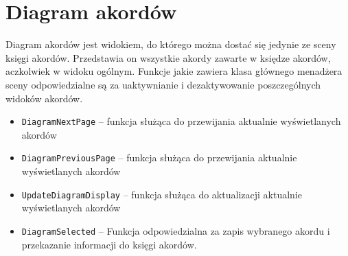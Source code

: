\section{Diagram akordów}

Diagram akordów jest widokiem, do którego można dostać się jedynie ze sceny księgi akordów. Przedstawia on wszystkie akordy zawarte w księdze akordów, aczkolwiek w widoku ogólnym. Funkcje jakie zawiera klasa głównego menadżera sceny odpowiedzialne są za uaktywnianie i dezaktywowanie poszczególnych widoków akordów.

\begin{itemize}
    \item \texttt{DiagramNextPage} -- funkcja służąca do przewijania aktualnie wyświetlanych akordów
    \item \texttt{DiagramPreviousPage} -- funkcja służąca do przewijania aktualnie wyświetlanych akordów
    \item \texttt{UpdateDiagramDisplay} -- funkcja służąca do aktualizacji aktualnie wyświetlanych akordów
    \item \texttt{DiagramSelected} -- Funkcja odpowiedzialna za zapis wybranego akordu i przekazanie informacji do księgi akordów.
\end{itemize}